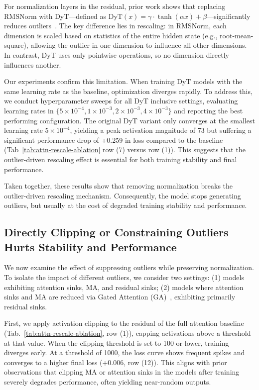 \documentclass{article} %
\begin{document}
For normalization layers in the residual, prior work shows that replacing RMSNorm with DyT---defined as \( \text{DyT}(x) = \gamma \cdot \tanh(\alpha x) + \beta \)---significantly reduces outliers~\citep{he2024understanding,owen2025refined}. 
The key difference lies in rescaling: in RMSNorm, each dimension is scaled based on statistics of the entire hidden state (e.g., root-mean-square), allowing the outlier in one dimension to influence all other dimensions. 
In contrast, DyT uses only pointwise operations, so no dimension directly influences another.

Our experiments confirm this limitation. 
When training DyT models with the same learning rate as the baseline, optimization diverges rapidly. 
To address this, we conduct hyperparameter sweeps for all DyT inclusive settings, evaluating learning rates in \(\{5 \times 10^{-4}, 1 \times 10^{-3}, 2 \times 10^{-3}, 4 \times 10^{-3}\}\) and reporting the best performing configuration. 
The original DyT variant only converges at the smallest learning rate \(5 \times 10^{-4}\), yielding a peak activation magnitude of 73 but suffering a significant performance drop of +0.259 in loss compared to the baseline (Tab~\ref{tab:attn-rescale-ablation} row (7) versus row (1)). 
This suggests that the outlier-driven rescaling effect is essential for both training stability and final performance. 

Taken together, these results show that removing normalization breaks the outlier-driven rescaling mechanism. 
Consequently, the model stops generating outliers, but usually at the cost of degraded training stability and performance.


\subsection{Directly Clipping or Constraining Outliers Hurts Stability and Performance}
\label{sec:clip}

We now examine the effect of suppressing outliers while preserving normalization. 
To isolate the impact of different outliers, we consider two settings:  
(1) models exhibiting attention sinks, MA, and residual sinks;  
(2) models where attention sinks and MA are reduced via Gated Attention (GA)~\citep{bondarenko2023quantizable,an2025systematic,qiu2025gated}, exhibiting primarily residual sinks.

First, we apply activation clipping to the residual of the full attention baseline (Tab.~\ref{tab:attn-rescale-ablation}, row (1)), capping activations above a threshold at that value. 
When the clipping threshold is set to 100 or lower, training diverges early. 
At a threshold of 1000, the loss curve shows frequent spikes and converges to a higher final loss (+0.006, row (12)). 
This aligns with prior observations that clipping MA or attention sinks in the models after training severely degrades performance, often yielding near-random outputs.
\end{document}
